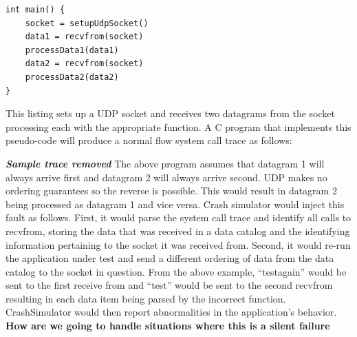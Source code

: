             \begin{verbatim}
int main() {
    socket = setupUdpSocket()
    data1 = recvfrom(socket)
    processData1(data1)
    data2 = recvfrom(socket)
    processData2(data2)
}
            \end{verbatim}

            This listing sets up a UDP socket and receives two datagrams from the socket processing each with the
            appropriate function. A C program that implements this pseudo-code will produce a normal flow system call trace
            as follows:

            \textbf{\emph{Sample trace removed}}
            The above program assumes that datagram 1 will always arrive first and datagram 2 will always arrive second. UDP
            makes no ordering guarantees so the reverse is possible. This would result in datagram 2 being processed as
            datagram 1 and vice versa. Crash simulator would inject this fault as follows. First, it would parse the system
            call trace and identify all calls to recvfrom, storing the data that was received in a data catalog and the
            identifying information pertaining to the socket it was received from. Second, it would re-run the application
            under test and send a different ordering of data from the data catalog to the socket in question. From the above
            example, ``testagain'' would be sent to the first receive from and ``test'' would be sent to the second recvfrom
            resulting in each data item being parsed by the incorrect function. CrashSimulator would then report
            abnormalities in the application's behavior. \textbf{How are we going to handle situations where this is a
            silent failure}
